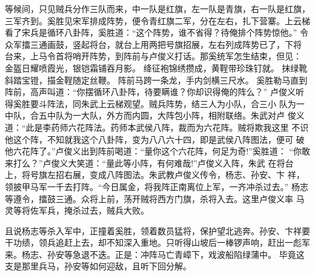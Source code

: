 等候间，只见贼兵分作三队而来，中一队是红旗，左一队是青旗，右一队是红旗，
三军齐到。奚胜见宋军排成阵势，便令青红旗二军，分在左右，扎下营寨。上云梯
看了宋兵是循环八卦阵，奚胜道：“这个阵势，谁不省得？待俺排个阵势惊他。”
令众军擂三通画鼓，竖起将台，就台上用两把号旗招展，左右列成阵势已了，下将
台来，上马令首将哨开阵势，到阵前与卢俊义打话。那奚统军怎生结束，但见：
金盔日耀喷霞光，银铠霜铺吞月影。
绛征袍锦绣攒成，黄鞓带珍珠钉就。
抹绿靴斜踏宝镫，描金鞓随定丝鞭。
阵前马跨一条龙，手内剑横三尺水。
奚胜勒马直到阵前，高声叫道：“你摆循环八卦阵，待要瞒谁？你却识得俺的阵么？”
卢俊义听得奚胜要斗阵法，同朱武上云梯观望。贼兵阵势，结三人为小队，合三小
队为一中队，合五中队为一大队，外方而内圆，大阵包小阵，相附联络。朱武对卢
俊义道：“此是李药师六花阵法。药师本武侯八阵，裁而为六花阵。贼将欺我这里
不识他这个阵，不知就我这个八卦阵，变为八八六十四，即是武侯八阵图法，便可
破他六花阵了。”卢俊义出到阵前喝道：“量你这个六花阵，何足为奇!”奚胜道：
“你敢来打么？”卢俊义大笑道：“量此等小阵，有何难哉!”卢俊义入阵，朱武
在将台上，将号旗左招右展，变成八阵图法。朱武教卢俊义传令，杨志、孙安、卞
祥，领披甲马军一千去打阵。“今日属金，将我阵正南离位上军，一齐冲杀过去。”
杨志等遵令，擂鼓三通。众将上前，荡开贼将西方门旗，杀将入去。这里卢俊义率
马灵等将佐军兵，掩杀过去，贼兵大败。

且说杨志等杀入军中，正撞着奚胜，领着数员猛将，保护望北逃奔。孙安、卞祥要
干功绩，领兵追赶上去，却不知深入重地。只听得山坡后一棒锣声响，赶出一彪军
来。杨志、孙安等急退不迭。正是：冲阵马亡青嶂下，戏波船陷绿蒲中。
毕竟这支是那里兵马，孙安等如何迎敌，且听下回分解。